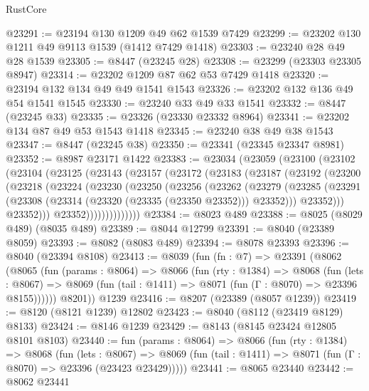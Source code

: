 \begin{lexlean}{RustCore}
\begin{coremodule}
@23291 := @23194 @130 @1209 @49 @62 @1539 @7429
@23299 := @23202 @130 @1211 @49 @9113 @1539 (@1412 @7429 @1418)
@23303 := @23240 @28 @49 @28 @1539
@23305 := @8447 (@23245 @28)
@23308 := @23299 (@23303 @23305 @8947)
@23314 := @23202 @1209 @87 @62 @53 @7429 @1418
@23320 := @23194 @132 @134 @49 @49 @1541 @1543
@23326 := @23202 @132 @136 @49 @54 @1541 @1545
@23330 := @23240 @33 @49 @33 @1541
@23332 := @8447 (@23245 @33)
@23335 := @23326 (@23330 @23332 @8964)
@23341 := @23202 @134 @87 @49 @53 @1543 @1418
@23345 := @23240 @38 @49 @38 @1543
@23347 := @8447 (@23245 @38)
@23350 := @23341 (@23345 @23347 @8981)
@23352 := @8987 @23171 @1422
@23383 := @23034
    (@23059
      (@23100
        (@23102
          (@23104
            (@23125
              (@23143
                (@23157
                  (@23172
                    (@23183
                      (@23187
                        (@23192
                          (@23200
                            (@23218
                              (@23224
                                (@23230
                                  (@23250
                                    (@23256
                                      (@23262
                                        (@23279
                                          (@23285
                                            (@23291
                                              (@23308
                                                (@23314 (@23320 (@23335 (@23350 @23352))) @23352)))
                                            @23352)))
                                      @23352)))
                                @23352))))))))))))))
@23384 := @8023 @489
@23388 := @8025 (@8029 @489) (@8035 @489)
@23389 := @8044 @12799
@23391 := @8040 (@23389 @8059)
@23393 := @8082 (@8083 @489)
@23394 := @8078 @23393
@23396 := @8040 (@23394 @8108)
@23413 := @8039
    (fun (fn : @7) =>
    @23391
      (@8062
        (@8065
          (fun (params : @8064) =>
          @8066
            (fun (rty : @1384) =>
            @8068
              (fun (lets : @8067) =>
              @8069 (fun (tail : @1411) => @8071 (fun (Γ : @8070) => @23396 @8155))))))
        @8201))
    @1239
@23416 := @8207 (@23389 (@8057 @1239))
@23419 := @8120 (@8121 @1239) @12802
@23423 := @8040 (@8112 (@23419 @8129) @8133)
@23424 := @8146 @1239
@23429 := @8143 (@8145 @23424 @12805 @8101 @8103)
@23440 := fun (params : @8064) =>
  @8066
    (fun (rty : @1384) =>
    @8068
      (fun (lets : @8067) =>
      @8069 (fun (tail : @1411) => @8071 (fun (Γ : @8070) => @23396 (@23423 @23429)))))
@23441 := @8065 @23440
@23442 := @8062 @23441

\end{coremodule}
\end{lexlean}
